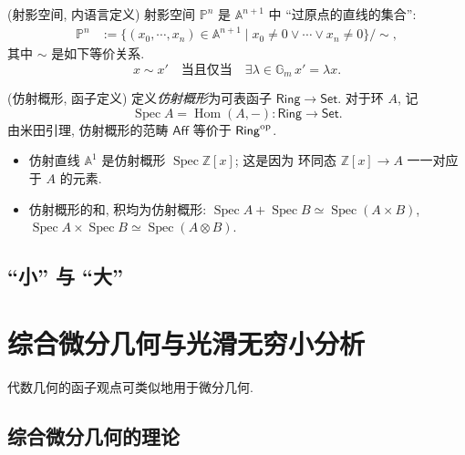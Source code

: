 
\begin{definition}
	{(射影空间, 内语言定义)}
	射影空间 $\mathbb P^n$ 是 $\mathbb A^{n+1}$ 中 ``过原点的直线的集合'':
	$$
	\begin{aligned}
		\mathbb P^n&:=
		\{(x_0,\cdots,x_n)\in \mathbb A^{n+1}\mid
		x_0\neq 0\lor\cdots\lor x_n\neq 0\}\big/ \sim,
	\end{aligned}
	$$
	其中 $\sim$ 是如下等价关系.
	$$
	x\sim x'\quad\text{当且仅当}\quad \exists \lambda \in \mathbb G_m\,x'=\lambda x.
	$$
%	
\end{definition}

\begin{definition}
	{(仿射概形, 函子定义)}
	定义\emph{仿射概形}为可表函子 $\mathsf {Ring}\to\mathsf {Set}$. 对于环 $A$, 记
	$$
	\operatorname{Spec}A = \operatorname{Hom}(A,-)\colon \mathsf {Ring}\to \mathsf {Set}.
	$$
	由米田引理, 仿射概形的范畴 $\mathsf {Aff}$ 等价于 $\mathsf {Ring}^{\text{op}}$.
\end{definition}
\begin{example}
	{}
	\begin{itemize}
		\item 仿射直线 $\mathbb A^1$ 是仿射概形 $\operatorname{Spec}\mathbb{Z}[x]$; 这是因为 环同态 $\mathbb{Z}[x]\to A$ 一一对应于 $A$ 的元素.
		\item 仿射概形的和, 积均为仿射概形: $\operatorname{Spec}A+\operatorname{Spec}B\simeq \operatorname{Spec}(A\times B)$, $\operatorname{Spec}A\times\operatorname{Spec}B\simeq\operatorname{Spec}(A\otimes B)$.
	\end{itemize}
\end{example}

\subsection{``小'' \topos{}与 ``大'' \topos{}}




\section{综合微分几何与光滑无穷小分析}

代数几何的函子观点可类似地用于微分几何.

\subsection{综合微分几何的理论}

